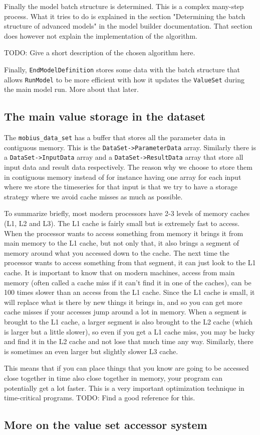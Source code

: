 \documentclass[11pt]{article}
\theoremstyle{definition}
\begin{document}
Finally the model batch structure is determined. This is a complex many-step process. What it tries to do is explained in the section "Determining the batch structure of advanced models" in the model builder documentation. That section does however not explain the implementation of the algorithm.

TODO: Give a short description of the chosen algorithm here.

Finally, {\tt EndModelDefinition} stores some data with the batch structure that allows {\tt RunModel} to be more efficient with how it updates the {\tt ValueSet} during the main model run. More about that later.

\subsection{The main value storage in the dataset}

The {\tt mobius\_data\_set} has a buffer that stores all the parameter data in contiguous memory. This is the {\tt DataSet->ParameterData} array. Similarly there is a {\tt DataSet->InputData} array and a {\tt DataSet->ResultData} array that store all input data and result data respectively. The reason why we choose to store them in contiguous memory instead of for instance having one array for each input where we store the timeseries for that input is that we try to have a storage strategy where we avoid cache misses as much as possible.

To summarize briefly, most modern processors have 2-3 levels of memory caches (L1, L2 and L3). The L1 cache is fairly small but is extremely fast to access. When the processor wants to access something from memory it brings it from main memory to the L1 cache, but not only that, it also brings a segment of memory around what you accessed down to the cache. The next time the processor wants to access something from that segment, it can just look to the L1 cache. It is important to know that on modern machines, access from main memory (often called a cache miss if it can't find it in one of the caches), can be 100 times slower than an access from the L1 cache. Since the L1 cache is small, it will replace what is there by new things it brings in, and so you can get more cache misses if your accesses jump around a lot in memory. When a segment is brought to the L1 cache, a larger segment is also brought to the L2 cache (which is larger but a little slower), so even if you get a L1 cache miss, you may be lucky and find it in the L2 cache and not lose that much time any way. Similarly, there is sometimes an even larger but slightly slower L3 cache.

This means that if you can place things that you know are going to be accessed close together in time also close together in memory, your program can potentially get a lot faster. This is a very important optimization technique in time-critical programs. TODO: Find a good reference for this.

\subsection{More on the value set accessor system}
\end{document}
